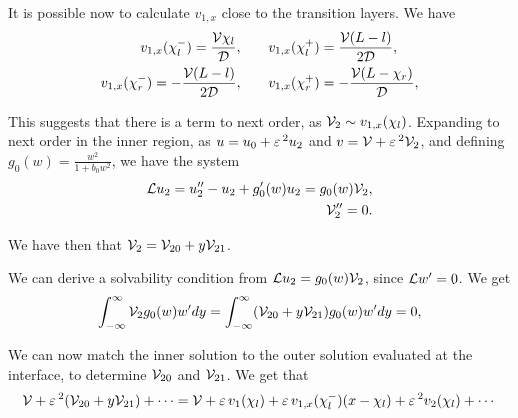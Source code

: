 It is possible now to calculate $v_{1,x}$ close to the transition layers. We have
% 
\begin{equation}
\label{eqn:v1x}
\begin{split}
\begin{aligned}
  v_{1,x}(\chi_l^-) = \frac{\mathcal{V}\chi_l}{\mathcal{D}},\qquad &v_{1,x}(\chi_l^+) = \frac{\mathcal{V}(L-l)}{2\mathcal{D}},\\
  v_{1,x}(\chi_r^-) = -\frac{\mathcal{V}(L-l)}{2\mathcal{D}},\qquad &v_{1,x}(\chi_r^+) = -\frac{\mathcal{V}(L-\chi_r)}{\mathcal{D}},\\
\end{aligned}
\end{split}
\end{equation}
% 


This suggests that there is a term to next order, as $\mathcal{V}_2\sim v_{1,x}(\chi_l)$. Expanding to next order in the inner region, as $u = u_0 + \varepsilon\,^2u_2$ and $v = \mathcal{V} + \varepsilon\,^2\mathcal{V}_2$, and defining $g_0(w) = \frac{w^2}{1+b_0w^2}$, we have the system
% 
\begin{equation*}
\begin{split}
\begin{aligned}
  \mathcal{L} u_2 =  u_2'' - u_2 + g_0'(w)u_2 = g_0(w)\mathcal{V}_2,\\
  \mathcal{V}_2'' = 0.
\end{aligned}
\end{split}
\end{equation*}
% 

We have then that $\mathcal{V}_2 = \mathcal{V}_{20} + y\mathcal{V}_{21}$. 

We can derive a solvability condition from $\mathcal{L} u_2 = g_0(w)\mathcal{V}_2$, since $\mathcal{L} w'=0$. We get
% 
\begin{equation*}
  \int_{-\infty}^{\infty}\mathcal{V}_2g_0(w)w'dy = \int_{-\infty}^{\infty}(\mathcal{V}_{20} + y\mathcal{V}_{21})g_0(w)w'dy = 0,
\end{equation*}
% 

We can now match the inner solution to the outer solution evaluated at the interface, to determine $\mathcal{V}_{20}$ and $\mathcal{V}_{21}$. We get that
% 
\begin{equation*}
  \mathcal{V} + \varepsilon\,^2(\mathcal{V}_{20} + y\mathcal{V}_{21}) + \cdots = \mathcal{V} + \varepsilon\, v_1(\chi_l) + \varepsilon\, v_{1,x}(\chi_l^-)(x-\chi_l) + \varepsilon\,^2v_2(\chi_l)+\cdots
\end{equation*}
% 

